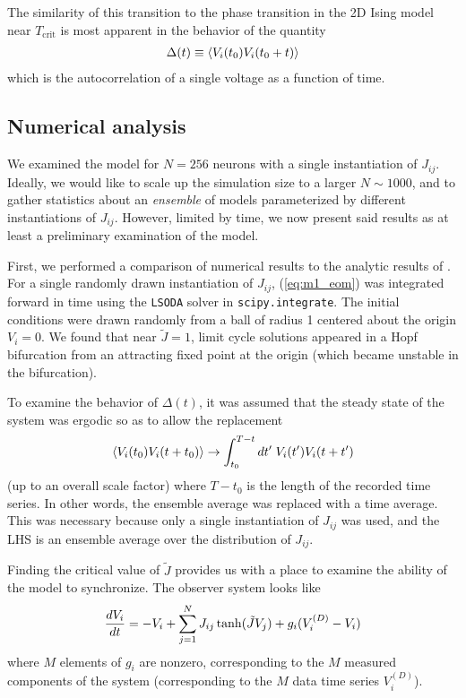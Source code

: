 \documentclass{article} %
\begin{document}
The similarity of this transition to the phase transition in the 2D Ising model near $T_\text{crit}$ is most apparent in the behavior of the quantity
\begin{align}
	\Delta(t) \equiv \left\langle V_i(t_0) V_i(t_0 + t) \right\rangle \label{eq:m1_Cteq}
\end{align}
which is the autocorrelation of a single voltage as a function of time.

\subsection{Numerical analysis}
We examined the model for $N=256$ neurons with a single instantiation of $J_{ij}$.  Ideally, we would like to scale up the simulation size to a larger $N \sim 1000$, and to gather statistics about an \emph{ensemble} of models parameterized by different instantiations of $J_{ij}$.  However, limited by time, we now present said results as at least a preliminary examination of the model.

First, we performed a comparison of numerical results to the analytic results of \cite{Sompolinsky1988}.  For a single randomly drawn instantiation of $J_{ij}$, (\ref{eq:m1_eom}) was integrated forward in time using the \texttt{LSODA} solver in \texttt{scipy.integrate}.  The initial conditions were drawn randomly from a ball of radius 1 centered about the origin $V_i=0$.  We found that near $\tilde{J}=1$, limit cycle solutions appeared in a Hopf bifurcation from an attracting fixed point at the origin (which became unstable in the bifurcation).

To examine the behavior of $\Delta(t)$, it was assumed that the steady state of the system was ergodic so as to allow the replacement
\begin{align*}
	\left\langle V_i(t_0)V_i(t+t_0) \right\rangle \rightarrow \int_{t_0}^{T-t} dt^{\prime} \; V_i(t^{\prime}) V_i(t+t^{\prime})
\end{align*}
(up to an overall scale factor) where $T-t_0$ is the length of the recorded time series.  In other words, the ensemble average was replaced with a time average.  This was necessary because only a single instantiation of $J_{ij}$ was used, and the LHS is an ensemble average over the distribution of $J_{ij}$.

Finding the critical value of $\tilde{J}$ provides us with a place to examine the ability of the model to synchronize. The observer system looks like
\begin{align}
	\frac{d V_i}{d t} = -V_i + \sum_{j=1}^{N} J_{ij} \tanh(\tilde{J} V_j) + g_i (V^{(D)}_i - V_i)
\end{align}
where $M$ elements of $g_i$ are nonzero, corresponding to the $M$ measured components of the system (corresponding to the $M$ data time series $V_i^{(D)}$).




\end{document}
